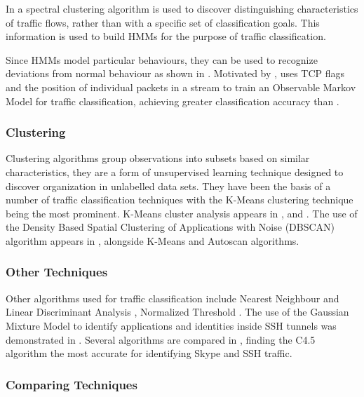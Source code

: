 \documentclass{ecuthesis}
\begin{document}
In \textcite{Bernaille:2005p6205} a spectral clustering algorithm is used to
discover distinguishing characteristics of traffic flows, rather than with a
specific set of classification goals. This information is used to build HMMs
for the purpose of traffic classification.

Since HMMs model particular behaviours, they can be used to recognize
deviations from normal behaviour as shown in
\textcite{EstevezTapiador:2003p7201}. Motivated by
\citeauthor{EstevezTapiador:2003p7201}, \textcite{Munz:2010p7085} uses TCP
flags and the position of individual packets in a stream to train an Observable
Markov Model for traffic classification, achieving greater classification
accuracy than \citeauthor{Bernaille:2005p6205}.

\subsubsection{Clustering}

Clustering algorithms group observations into subsets based on similar
characteristics, they are a form of unsupervised learning technique designed to
discover organization in unlabelled data sets. They have been the basis of a
number of traffic classification techniques with the K-Means clustering
technique being the most prominent.  K-Means cluster analysis appears in
\textcite{Bernaille:2006p2366}, \textcite{Erman:2007p3764} and
\textcite{Erman:2007p6206}. The use of the Density Based Spatial Clustering of
Applications with Noise (DBSCAN) algorithm appears in
\textcite{Erman:2006p3766}, alongside K-Means and Autoscan algorithms.

\subsubsection{Other Techniques}

Other algorithms used for traffic classification include Nearest Neighbour and
Linear Discriminant Analysis \parencite{Roughan:2004p3823}, Normalized
Threshold \parencite{Crotti:2007p3824}. The use of the Gaussian Mixture Model
to identify applications and identities inside SSH tunnels was demonstrated in
\textcite{Dusi:2008p6254}. Several algorithms are compared in
\textcite{Alshammari:2009p7474}, finding the C4.5 algorithm the most accurate
for identifying Skype and SSH traffic.

\subsubsection{Comparing Techniques}
\end{document}
